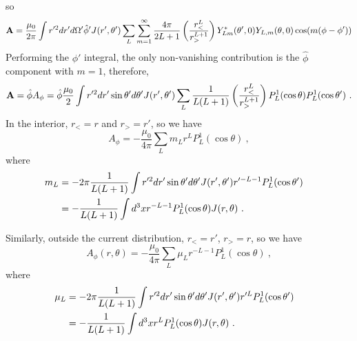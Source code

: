 \documentclass[12pt]{article}
\newcommand{\A}{{\bf A}}
\begin{document}
so
\begin{equation}
    \A = \frac{\mu_0}{2\pi} \int r'^2 dr' d\Omega' \hat{\phi}'J(r', \theta') \sum_{L}\sum_{m=1}^\infty \frac{4\pi}{2L+1}\left(\frac{r_<^L}{r_>^{L+1}}\right) Y_{Lm}^*(\theta', 0) Y_{L,m}(\theta, 0)\cos(m(\phi - \phi'))
\end{equation}
Performing the $\phi'$ integral, the only non-vanishing contribution is the $\hat{\phi}$ component with $m = 1$, therefore,
\begin{equation}
    \A = \hat{\phi} A_\phi = \hat{\phi} \frac{\mu_0}{2} \int r'^2 dr' \sin\theta' d\theta' J(r', \theta') \sum_{L} \frac{1}{L(L+1)} \left(\frac{r_<^L}{r_>^{L+1}}\right) P_L^1(\cos \theta) P_L^1(\cos \theta')~.
\end{equation}
In the interior, $r_< = r$ and $r_> = r'$, so we have
\begin{equation}
    A_\phi = -\frac{\mu_0}{4\pi} \sum_L m_L r^L P_L^1(\cos \theta)~,
\end{equation}
where
\begin{align}
    m_L &= -2\pi \frac{1}{L(L+1)}\int r'^2 dr' \sin \theta' d \theta' J(r', \theta') r'^{-L-1} P_L^1(\cos \theta') \cr
    &= -\frac{1}{L(L+1)} \int d^3 x r^{-L-1} P_L^1(\cos \theta) J(r, \theta)~.
\end{align}

Similarly, outside the current distribution, $r_< = r'$, $r_> = r$, so we have
\begin{equation}
    A_\phi (r, \theta) = -\frac{\mu_0}{4\pi} \sum_{L} \mu_L r^{-L-1} P_L^1(\cos \theta)~,
\end{equation}
where
\begin{align}
    \mu_L &= -2\pi \frac{1}{L(L+1)} \int r'^2 dr' \sin \theta' d\theta' J(r', \theta') r'^L P_L^1(\cos\theta')\cr
    &= - \frac{1}{L(L+1)} \int d^3 x r^L P_L^1(\cos \theta) J(r, \theta)~.
\end{align}
\end{document}
